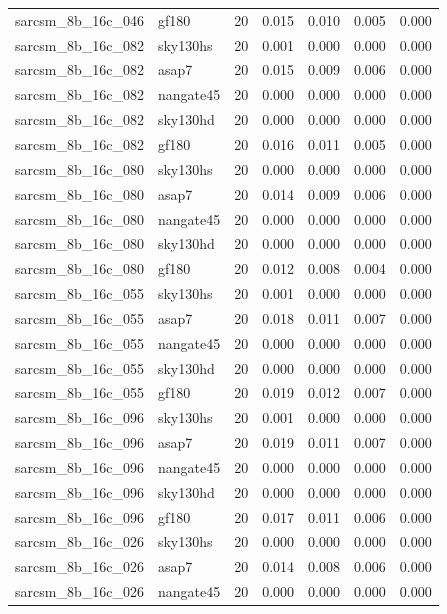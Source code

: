 \begin{tabular}{llrrrrr}
sarcsm\_8b\_16c\_046 & gf180 & 20 & 0.015 & 0.010 & 0.005 & 0.000 \\
sarcsm\_8b\_16c\_082 & sky130hs & 20 & 0.001 & 0.000 & 0.000 & 0.000 \\
sarcsm\_8b\_16c\_082 & asap7 & 20 & 0.015 & 0.009 & 0.006 & 0.000 \\
sarcsm\_8b\_16c\_082 & nangate45 & 20 & 0.000 & 0.000 & 0.000 & 0.000 \\
sarcsm\_8b\_16c\_082 & sky130hd & 20 & 0.000 & 0.000 & 0.000 & 0.000 \\
sarcsm\_8b\_16c\_082 & gf180 & 20 & 0.016 & 0.011 & 0.005 & 0.000 \\
sarcsm\_8b\_16c\_080 & sky130hs & 20 & 0.000 & 0.000 & 0.000 & 0.000 \\
sarcsm\_8b\_16c\_080 & asap7 & 20 & 0.014 & 0.009 & 0.006 & 0.000 \\
sarcsm\_8b\_16c\_080 & nangate45 & 20 & 0.000 & 0.000 & 0.000 & 0.000 \\
sarcsm\_8b\_16c\_080 & sky130hd & 20 & 0.000 & 0.000 & 0.000 & 0.000 \\
sarcsm\_8b\_16c\_080 & gf180 & 20 & 0.012 & 0.008 & 0.004 & 0.000 \\
sarcsm\_8b\_16c\_055 & sky130hs & 20 & 0.001 & 0.000 & 0.000 & 0.000 \\
sarcsm\_8b\_16c\_055 & asap7 & 20 & 0.018 & 0.011 & 0.007 & 0.000 \\
sarcsm\_8b\_16c\_055 & nangate45 & 20 & 0.000 & 0.000 & 0.000 & 0.000 \\
sarcsm\_8b\_16c\_055 & sky130hd & 20 & 0.000 & 0.000 & 0.000 & 0.000 \\
sarcsm\_8b\_16c\_055 & gf180 & 20 & 0.019 & 0.012 & 0.007 & 0.000 \\
sarcsm\_8b\_16c\_096 & sky130hs & 20 & 0.001 & 0.000 & 0.000 & 0.000 \\
sarcsm\_8b\_16c\_096 & asap7 & 20 & 0.019 & 0.011 & 0.007 & 0.000 \\
sarcsm\_8b\_16c\_096 & nangate45 & 20 & 0.000 & 0.000 & 0.000 & 0.000 \\
sarcsm\_8b\_16c\_096 & sky130hd & 20 & 0.000 & 0.000 & 0.000 & 0.000 \\
sarcsm\_8b\_16c\_096 & gf180 & 20 & 0.017 & 0.011 & 0.006 & 0.000 \\
sarcsm\_8b\_16c\_026 & sky130hs & 20 & 0.000 & 0.000 & 0.000 & 0.000 \\
sarcsm\_8b\_16c\_026 & asap7 & 20 & 0.014 & 0.008 & 0.006 & 0.000 \\
sarcsm\_8b\_16c\_026 & nangate45 & 20 & 0.000 & 0.000 & 0.000 & 0.000 \\

\end{tabular}
